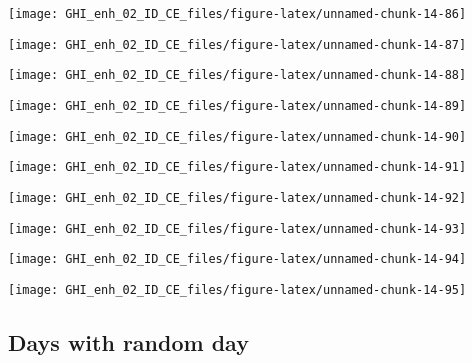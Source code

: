 \documentclass[
  10pt,
  a4paper,oneside]{article}
\begin{document}
\begin{center}\texttt{[image: GHI\_enh\_02\_ID\_CE\_files/figure-latex/unnamed-chunk-14-86]} \end{center}

\begin{center}\texttt{[image: GHI\_enh\_02\_ID\_CE\_files/figure-latex/unnamed-chunk-14-87]} \end{center}

\begin{center}\texttt{[image: GHI\_enh\_02\_ID\_CE\_files/figure-latex/unnamed-chunk-14-88]} \end{center}

\begin{center}\texttt{[image: GHI\_enh\_02\_ID\_CE\_files/figure-latex/unnamed-chunk-14-89]} \end{center}

\begin{center}\texttt{[image: GHI\_enh\_02\_ID\_CE\_files/figure-latex/unnamed-chunk-14-90]} \end{center}

\begin{center}\texttt{[image: GHI\_enh\_02\_ID\_CE\_files/figure-latex/unnamed-chunk-14-91]} \end{center}

\begin{center}\texttt{[image: GHI\_enh\_02\_ID\_CE\_files/figure-latex/unnamed-chunk-14-92]} \end{center}

\begin{center}\texttt{[image: GHI\_enh\_02\_ID\_CE\_files/figure-latex/unnamed-chunk-14-93]} \end{center}

\begin{center}\texttt{[image: GHI\_enh\_02\_ID\_CE\_files/figure-latex/unnamed-chunk-14-94]} \end{center}

\begin{center}\texttt{[image: GHI\_enh\_02\_ID\_CE\_files/figure-latex/unnamed-chunk-14-95]} \end{center}

\FloatBarrier

\hypertarget{days-with-random-day}{%
\subsection{Days with random day}\label{days-with-random-day}}
\end{document}

